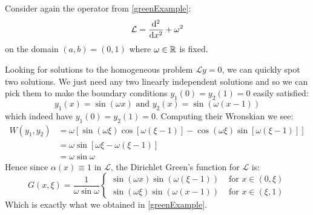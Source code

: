\documentclass[../main.tex]{subfiles}
\begin{document}
\begin{example}
  Consider again the operator from \cref{greenExample}:
  \[
    \mathcal{L} = \deriv[2]{}{x} + \omega^2
  \]
  on the domain $(a, b) = (0, 1)$ where $\omega \in \mathbb{R}$ is fixed.

  Looking for solutions to the homogeneous problem $\mathcal{L}y = 0$, we can quickly spot two solutions.
  We just need any two linearly independent solutions and so we can pick them to make the boundary conditions $y_1(0) = y_2(1) = 0$ easily satisfied:
  \[
    y_1(x) = \sin(\omega x) \text{ and } y_2(x) = \sin(\omega(x - 1))
  \]
  which indeed have $y_1(0) = y_2(1) = 0$.
  Computing their Wronskian we see:
  \begin{align*}
    W(y_1, y_2) &= \omega[\sin(\omega \xi)\cos[\omega(\xi - 1)] - \cos(\omega \xi) \sin[\omega(\xi - 1)]] \\
                &= \omega \sin[\omega \xi - \omega(\xi - 1)] \\
                &= \omega \sin \omega
  \end{align*}
  Hence since $\alpha(x) \equiv 1$ in $\mathcal{L}$, the Dirichlet Green's function for $\mathcal{L}$ is:
  \[
    G(x, \xi) = \frac{1}{\omega \sin \omega} \begin{cases}
    \sin(\omega x) \sin(\omega(\xi - 1)) & \text{ for } x \in (0, \xi) \\
    \sin(\omega \xi) \sin(\omega(x -  1)) & \text{ for } x \in (\xi, 1)
    \end{cases}
  \]
  Which is exactly what we obtained in \cref{greenExample}.
\end{example}
\end{document}
